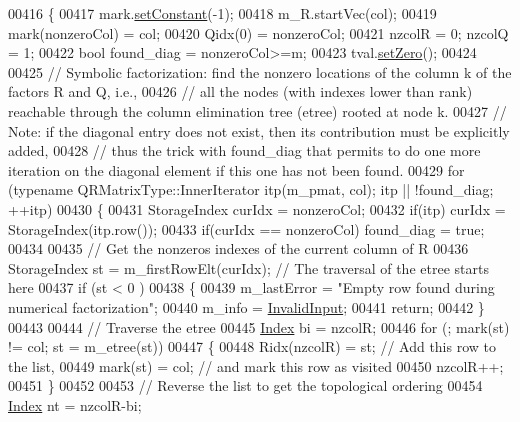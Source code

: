 \begin{DoxyCode}
00416   \{
00417     mark.\hyperlink{class_eigen_1_1_plain_object_base_ac8dea1df3d92b752cc683ff42abf6f9b}{setConstant}(-1);
00418     m\_R.startVec(col);
00419     mark(nonzeroCol) = col;
00420     Qidx(0) = nonzeroCol;
00421     nzcolR = 0; nzcolQ = 1;
00422     \textcolor{keywordtype}{bool} found\_diag = nonzeroCol>=m;
00423     tval.\hyperlink{class_eigen_1_1_plain_object_base_ac21ad5f989f320e46958b75ac8d9a1da}{setZero}(); 
00424     
00425     \textcolor{comment}{// Symbolic factorization: find the nonzero locations of the column k of the factors R and Q, i.e.,}
00426     \textcolor{comment}{// all the nodes (with indexes lower than rank) reachable through the column elimination tree (etree)
       rooted at node k.}
00427     \textcolor{comment}{// Note: if the diagonal entry does not exist, then its contribution must be explicitly added,}
00428     \textcolor{comment}{// thus the trick with found\_diag that permits to do one more iteration on the diagonal element if this
       one has not been found.}
00429     \textcolor{keywordflow}{for} (\textcolor{keyword}{typename} QRMatrixType::InnerIterator itp(m\_pmat, col); itp || !found\_diag; ++itp)
00430     \{
00431       StorageIndex curIdx = nonzeroCol;
00432       \textcolor{keywordflow}{if}(itp) curIdx = StorageIndex(itp.row());
00433       \textcolor{keywordflow}{if}(curIdx == nonzeroCol) found\_diag = \textcolor{keyword}{true};
00434       
00435       \textcolor{comment}{// Get the nonzeros indexes of the current column of R}
00436       StorageIndex st = m\_firstRowElt(curIdx); \textcolor{comment}{// The traversal of the etree starts here}
00437       \textcolor{keywordflow}{if} (st < 0 )
00438       \{
00439         m\_lastError = \textcolor{stringliteral}{"Empty row found during numerical factorization"};
00440         m\_info = \hyperlink{group__enums_gga85fad7b87587764e5cf6b513a9e0ee5ea945604f62795ffc70aedf2bd12ea0434}{InvalidInput};
00441         \textcolor{keywordflow}{return};
00442       \}
00443 
00444       \textcolor{comment}{// Traverse the etree }
00445       \hyperlink{namespace_eigen_a62e77e0933482dafde8fe197d9a2cfde}{Index} bi = nzcolR;
00446       \textcolor{keywordflow}{for} (; mark(st) != col; st = m\_etree(st))
00447       \{
00448         Ridx(nzcolR) = st;  \textcolor{comment}{// Add this row to the list,}
00449         mark(st) = col;     \textcolor{comment}{// and mark this row as visited}
00450         nzcolR++;
00451       \}
00452 
00453       \textcolor{comment}{// Reverse the list to get the topological ordering}
00454       \hyperlink{namespace_eigen_a62e77e0933482dafde8fe197d9a2cfde}{Index} nt = nzcolR-bi;

\end{DoxyCode}
